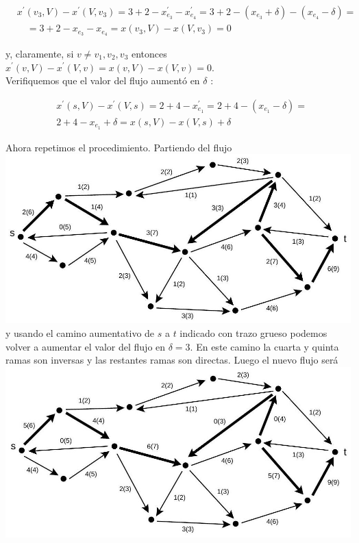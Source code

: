 \documentclass[10pt]{article}
\begin{document}
$$
\begin{aligned}
& x^{\prime}\left(v_{3}, V\right)-x^{\prime}\left(V, v_{3}\right)=3+2-x_{e_{3}}^{\prime}-x_{e_{4}}^{\prime}=3+2-\left(x_{e_{3}}+\delta\right)-\left(x_{e_{4}}-\delta\right)= \\
& \quad=3+2-x_{e_{3}}-x_{e_{4}}=x\left(v_{3}, V\right)-x\left(V, v_{3}\right)=0
\end{aligned}
$$

y, claramente, si $v \neq v_{1}, v_{2}, v_{3}$ entonces $x^{\prime}(v, V)-x^{\prime}(V, v)=x(v, V)-x(V, v)=0$.\\
Verifiquemos que el valor del flujo aumentó en $\delta$ :

$$
\begin{aligned}
& x^{\prime}(s, V)-x^{\prime}(V, s)=2+4-x_{e_{1}}^{\prime}=2+4-\left(x_{e_{1}}-\delta\right)= \\
& 2+4-x_{e_{1}}+\delta=x(s, V)-x(V, s)+\delta
\end{aligned}
$$

Ahora repetimos el procedimiento. Partiendo del flujo\\
\includegraphics[max width=\textwidth, center]{2025_09_05_aa5f7b8425e7dd302062g-05(1)}\\
y usando el camino aumentativo de $s$ a $t$ indicado con trazo grueso podemos volver a aumentar el valor del flujo en $\delta=3$. En este camino la cuarta y quinta ramas son inversas y las restantes ramas son directas. Luego el nuevo flujo será\\
\includegraphics[max width=\textwidth, center]{2025_09_05_aa5f7b8425e7dd302062g-05}
\end{document}
